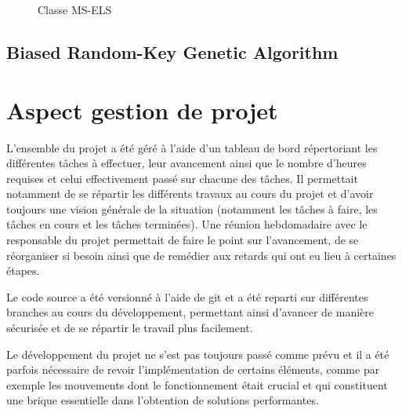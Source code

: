 			\begin{figure}[h!]
			
				\centering
				\begin{tikzpicture}
					
				\end{tikzpicture}
				\caption[UML -- Métaheuristique MS-ELS]{Classe MS-ELS}
				\label{uml:ms-els}
			\end{figure}

		\subsection{Biased Random-Key Genetic Algorithm}
	\section{Aspect gestion de projet}

		L'ensemble du projet a été géré à l'aide d'un tableau de bord répertoriant les différentes tâches à effectuer, leur avancement ainsi que le nombre d'heures requises et celui effectivement passé sur chacune des tâches. Il permettait notamment de se répartir les différents travaux au cours du projet et d'avoir toujours une vision générale de la situation (notamment les tâches à faire, les tâches en cours et les tâches terminées). Une réunion hebdomadaire avec le responsable du projet permettait de faire le point sur l'avancement, de se réorganiser si besoin ainsi que de remédier aux retards qui ont eu lieu à certaines étapes. 
		
		Le code source a été versionné à l'aide de git et a été reparti sur différentes branches au cours du développement, permettant ainsi d'avancer de manière sécurisée et de se répartir le travail plus facilement.
		
		Le développement du projet ne s'est pas toujours passé comme prévu et il a été parfois nécessaire de revoir l'implémentation de certains éléments, comme par exemple les mouvements dont le fonctionnement était crucial et qui constituent une brique essentielle dans l'obtention de solutions performantes.
		
